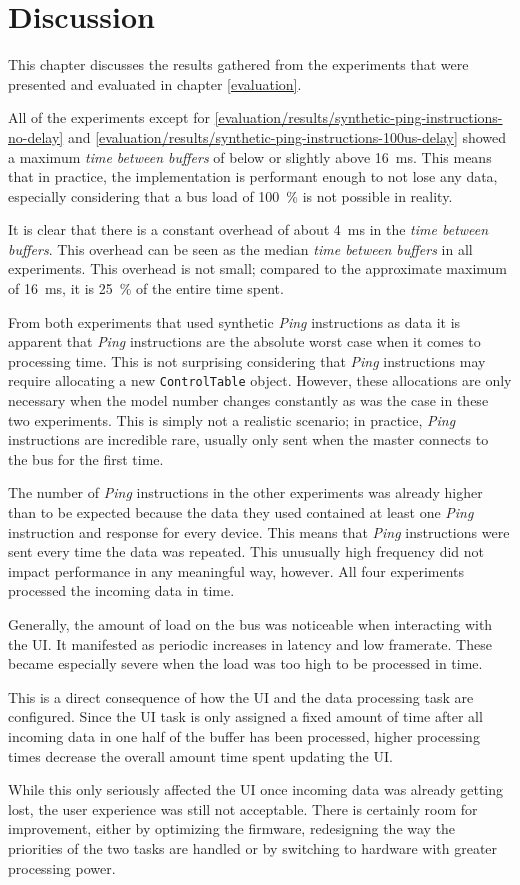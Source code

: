 \chapter{Discussion}
\label{discussion}

This chapter discusses the results gathered from the experiments that were presented and evaluated in
chapter \ref{evaluation}.
\bigbreak

All of the experiments except for \ref{evaluation/results/synthetic-ping-instructions-no-delay} and
\ref{evaluation/results/synthetic-ping-instructions-100us-delay} showed a maximum \textit{time between buffers}
of below or slightly above \SI{16}{\milli\second}. This means that in practice, the implementation is
performant enough to not lose any data, especially considering that a bus load of \SI{100}{\percent}
is not possible in reality.

It is clear that there is a constant overhead of about \SI{4}{\milli\second} in the
\textit{time between buffers}. This overhead can be seen as the median \textit{time between buffers}
in all experiments. This overhead is not small; compared to the approximate maximum of \SI{16}{\milli\second},
it is \SI{25}{\percent} of the entire time spent.

From both experiments that used synthetic \textit{Ping} instructions as data it is apparent that
\textit{Ping} instructions are the absolute worst case when it comes to processing time. This is
not surprising considering that \textit{Ping} instructions may require allocating a new
\lstinline{ControlTable} object. However, these allocations are only necessary when the model number
changes constantly as was the case in these two experiments. This is simply not a realistic scenario;
in practice, \textit{Ping} instructions are incredible rare, usually only sent when the master
connects to the bus for the first time.

The number of \textit{Ping} instructions in the other experiments was already higher than to be expected
because the data they used contained at least one \textit{Ping} instruction and response for every device.
This means that \textit{Ping} instructions were sent every time the data was repeated. This unusually
high frequency did not impact performance in any meaningful way, however. All four experiments processed
the incoming data in time.

Generally, the amount of load on the bus was noticeable when interacting with the UI. It manifested
as periodic increases in latency and low framerate. These became especially severe when the load was
too high to be processed in time.

This is a direct consequence of how the UI and the data processing task are configured. Since the UI
task is only assigned a fixed amount of time after all incoming data in one half of the buffer has
been processed, higher processing times decrease the overall amount time spent updating the UI.

While this only seriously affected the UI once incoming data was already getting lost, the user
experience was still not acceptable. There is certainly room for improvement, either by optimizing
the firmware, redesigning the way the priorities of the two tasks are handled or by switching to
hardware with greater processing power.
